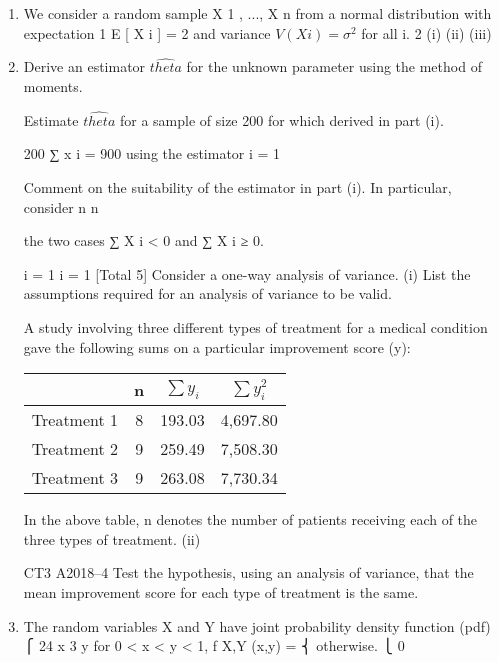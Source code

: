 \documentclass[a4paper,12pt]{article}
\begin{document}
\begin{enumerate}

\item We consider a random sample X 1 , ..., X n from a normal distribution with expectation
1
E [ X i ] =  2 and variance $V(X i ) = \sigma^2$ for all i.
2
(i)
(ii)
(iii)


\item Derive an estimator $\hat{theta}$  for the unknown parameter  using the method of
moments.

Estimate $\hat{theta}$ for a sample of size 200 for which
derived in part (i).

200
∑ x i = 900 using the estimator
i = 1

Comment on the suitability of the estimator in part (i). In particular, consider
n
n


the two cases ∑ X i < 0 and ∑ X i ≥ 0.

i = 1
i = 1
[Total 5]
Consider a one-way analysis of variance.
(i)
List the assumptions required for an analysis of variance to be valid.

A study involving three different types of treatment for a medical condition gave the
following sums on a particular improvement score (y):


\begin{center}
\begin{tabular}{|c|c|c|c|}
& n & $\sum y_i$ & $\sum y^2_i$ \\ \hline
Treatment 1 & 8 & 193.03 & 4,697.80 \\ \hline
Treatment 2 & 9 & 259.49 & 7,508.30 \\ \hline 
Treatment 3 & 9 & 263.08 &  7,730.34 \\ \hline
\end{tabular}
\end{center}

In the above table, n denotes the number of patients receiving each of the three types
of treatment.
(ii)


CT3 A2018–4
Test the hypothesis, using an analysis of variance, that the mean improvement
score for each type of treatment is the same.
\item %
The random variables X and Y have joint probability density function (pdf)
⎧ 24 x 3 y for 0 < x < y < 1,
f X,Y (x,y) = ⎨
otherwise.
⎩ 0


\end{enumerate}
\end{document}
